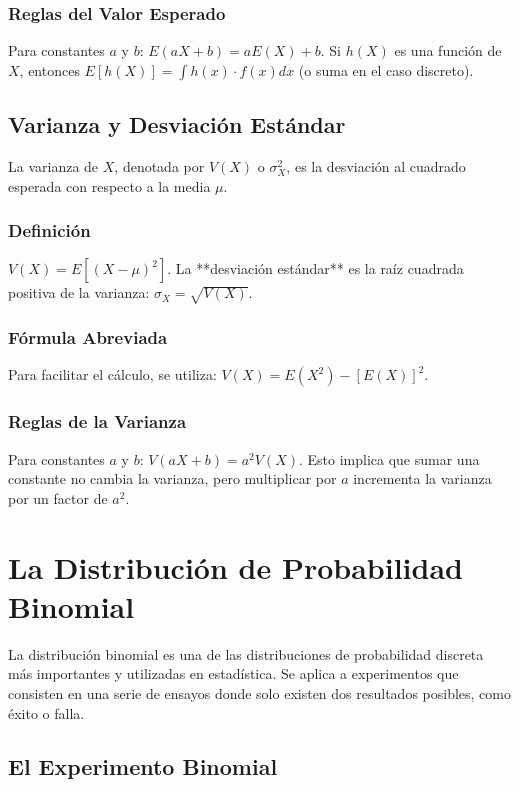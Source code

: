\documentclass[a4paper]{article}
\begin{document}
\subsubsection{Reglas del Valor Esperado}
Para constantes $a$ y $b$: $E(aX + b) = aE(X) + b$.
Si $h(X)$ es una función de $X$, entonces $E[h(X)] = \int h(x) \cdot f(x) dx$ (o suma en el caso discreto).

\subsection{Varianza y Desviación Estándar}

La varianza de $X$, denotada por $V(X)$ o $\sigma^2_X$, es la desviación al cuadrado esperada con respecto a la media $\mu$.

\subsubsection{Definición}
$V(X) = E[(X - \mu)^2]$.
La **desviación estándar** es la raíz cuadrada positiva de la varianza: $\sigma_X = \sqrt{V(X)}$.

\subsubsection{Fórmula Abreviada}
Para facilitar el cálculo, se utiliza:
$V(X) = E(X^2) - [E(X)]^2$.

\subsubsection{Reglas de la Varianza}
Para constantes $a$ y $b$: $V(aX + b) = a^2 V(X)$.
Esto implica que sumar una constante no cambia la varianza, pero multiplicar por $a$ incrementa la varianza por un factor de $a^2$.

\section{La Distribución de Probabilidad Binomial}

La distribución binomial es una de las distribuciones de probabilidad discreta más importantes y utilizadas en estadística. Se aplica a experimentos que consisten en una serie de ensayos donde solo existen dos resultados posibles, como éxito o falla.

\subsection{El Experimento Binomial}
\end{document}
